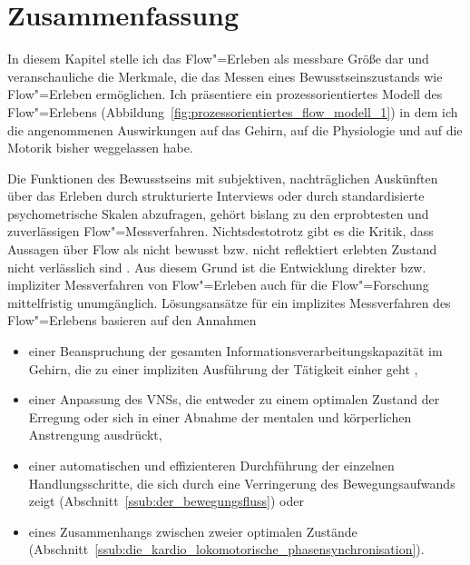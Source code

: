 

\section{Zusammenfassung} 

\label{sec:zusammenfassung_3}

In diesem Kapitel stelle ich das Flow"=Erleben als messbare Größe dar und veranschauliche die Merkmale, die das Messen eines Bewusstseinszustands wie Flow"=Erleben ermöglichen. Ich präsentiere ein prozessorientiertes Modell des Flow"=Erlebens (Abbildung~\ref{fig:prozessorientiertes_flow_modell_1}) in dem ich die angenommenen Auswirkungen auf das Gehirn, auf die Physiologie und auf die Motorik bisher weggelassen habe. 

Die Funktionen des Bewusstseins mit subjektiven, nachträglichen Auskünften über das Erleben durch strukturierte Interviews oder durch standardisierte psychometrische Skalen abzufragen, gehört bislang zu den erprobtesten und zuverlässigen Flow"=Messverfahren. Nichtsdestotrotz gibt es die Kritik, dass Aussagen über Flow als nicht bewusst bzw. nicht reflektiert erlebten Zustand nicht verlässlich sind \citep{Henk2014}. Aus diesem Grund ist die Entwicklung direkter bzw. impliziter Messverfahren von Flow"=Erleben auch für die Flow"=Forschung mittelfristig unumgänglich. Lösungsansätze für ein implizites Messverfahren des Flow"=Erlebens basieren auf den Annahmen 
\begin{itemize}
	
	\item einer Beanspruchung der gesamten Informationsverarbeitungskapazität im Gehirn, die zu einer impliziten Ausführung der Tätigkeit einher geht \citep{Dietrich2004},
	
	\item einer Anpassung des \ac{VNS}s, die entweder zu einem optimalen Zustand der Erregung \citep{deManzano2010, Keller2011} oder sich in einer Abnahme der mentalen und körperlichen Anstrengung \citep{Peifer2014, Tozman2015, Harmat2015} ausdrückt,
	
	\item einer automatischen und effizienteren Durchführung der einzelnen Handlungsschritte, die sich durch eine Verringerung des Bewegungsaufwands zeigt (Abschnitt~\ref{ssub:der_bewegungsfluss}) oder 
	
	\item eines Zusammenhangs zwischen zweier optimalen Zustände (Abschnitt~\ref{ssub:die_kardio_lokomotorische_phasensynchronisation}). 
\end{itemize}

